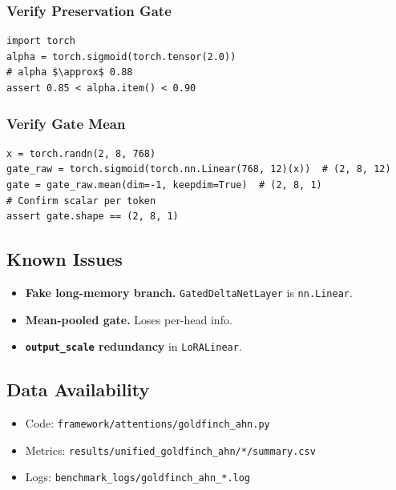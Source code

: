 \subsubsection{Verify Preservation Gate}

\begin{lstlisting}
import torch
alpha = torch.sigmoid(torch.tensor(2.0))
# alpha $\approx$ 0.88
assert 0.85 < alpha.item() < 0.90
\end{lstlisting}

\subsubsection{Verify Gate Mean}

\begin{lstlisting}
x = torch.randn(2, 8, 768)
gate_raw = torch.sigmoid(torch.nn.Linear(768, 12)(x))  # (2, 8, 12)
gate = gate_raw.mean(dim=-1, keepdim=True)  # (2, 8, 1)
# Confirm scalar per token
assert gate.shape == (2, 8, 1)
\end{lstlisting}

\subsection{Known Issues}

\begin{itemize}
\item \textbf{Fake long-memory branch.} \texttt{GatedDeltaNetLayer} is \texttt{nn.Linear}.
\item \textbf{Mean-pooled gate.} Loses per-head info.
\item \textbf{\texttt{output\_scale} redundancy} in \texttt{LoRALinear}.

\end{itemize}
\subsection{Data Availability}

\begin{itemize}
\item Code: \texttt{framework/attentions/goldfinch\_ahn.py}
\item Metrics: \texttt{results/unified\_goldfinch\_ahn/*/summary.csv}
\item Logs: \texttt{benchmark\_logs/goldfinch\_ahn\_*.log}

\end{itemize}




